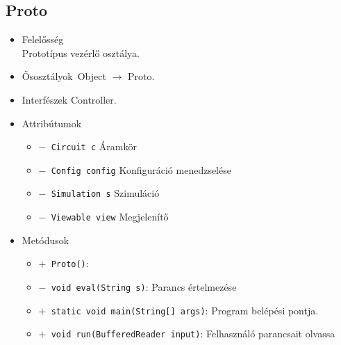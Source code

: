 \subsection{Proto}
\begin{itemize}
\item Felelősség\\
Prototípus vezérlő osztálya.
\item Ősosztályok\ Object $\rightarrow{}$ Proto.
\item Interfészek Controller.
\item Attribútumok $\ $
\begin{itemize}
	\item[] \texttt{$-$ Circuit c} Áramkör
	\item[] \texttt{$-$ Config config} Konfiguráció menedzselése
	\item[] \texttt{$-$ Simulation s} Szimuláció
	\item[] \texttt{$-$ Viewable view} Megjelenítő
\end{itemize}
\item Metódusok$\ $
\begin{itemize}
	\item[] \texttt{$+$ Proto()}: 
	\item[] \texttt{$-$ void eval(String s)}: Parancs értelmezése
	\item[] \texttt{$+$ static void main(String[] args)}: Program belépési pontja.
	\item[] \texttt{$+$ void run(BufferedReader input)}: Felhasználó parancsait olvassa
\end{itemize}
\end{itemize}

